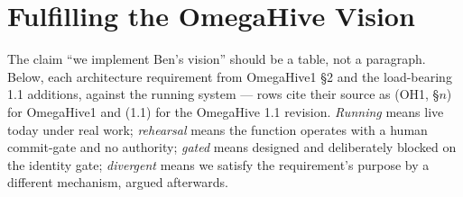 \section{Fulfilling the OmegaHive Vision}

The claim ``we implement Ben's vision'' should be a table, not a paragraph. Below, each architecture requirement from OmegaHive1 \S2 and the load-bearing 1.1 additions, against the running system --- rows cite their source as (OH1, \S$n$) for OmegaHive1 and (1.1) for the OmegaHive 1.1 revision. \emph{Running} means live today under real work; \emph{rehearsal} means the function operates with a human commit-gate and no authority; \emph{gated} means designed and deliberately blocked on the identity gate; \emph{divergent} means we satisfy the requirement's purpose by a different mechanism, argued afterwards.

